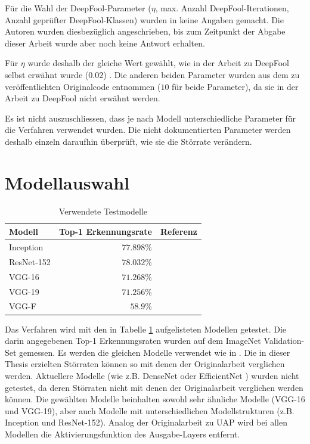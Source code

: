 \documentclass{FFHS_Thesis_Additions/ffhsthesis}
\begin{document}
Für die Wahl der DeepFool-Parameter ($\eta$, max. Anzahl DeepFool-Iterationen, Anzahl geprüfter DeepFool-Klassen) wurden in \cite{moosavi-dezfooli_universal_2017-1} keine Angaben gemacht. Die Autoren wurden diesbezüglich angeschrieben, bis zum Zeitpunkt der Abgabe dieser Arbeit wurde aber noch keine Antwort erhalten.

Für $\eta$ wurde deshalb der gleiche Wert gewählt, wie in der Arbeit zu DeepFool selbst erwähnt wurde ($0.02$) \cite{moosavi-dezfooli_deepfool_2016}. 
Die anderen beiden Parameter wurden aus dem zu \cite{moosavi-dezfooli_universal_2017-1} veröffentlichten Originalcode entnommen ($10$ für beide Parameter), da sie in der Arbeit zu DeepFool nicht erwähnt werden. 

Es ist nicht auszuschliessen, dass je nach Modell unterschiedliche Parameter für die Verfahren verwendet wurden. Die nicht dokumentierten Parameter werden deshalb einzeln daraufhin überprüft, wie sie die Störrate verändern. 

\section{Modellauswahl}
\label{c_modelle}


\begin{table}[]
\centering
\caption{Verwendete Testmodelle}
\begin{tabular}{|l|r|l|}
\hline
Modell				& Top-1 Erkennungsrate	& Referenz						\\ \hline
Inception			& $77.898\%$				&	\cite{szegedy_going_2015}	\\
ResNet-152			& $78.032\%$  			&	\cite{he_deep_2016}			\\
VGG-16				& $71.268\%$  			&	\cite{simonyan_very_2014}	\\
VGG-19				& $71.256\%$     		&	\cite{simonyan_very_2014}	\\
VGG-F				& $58.9\%$    			&	\cite{chatfield_return_2014}\\
\hline 
\end{tabular}
\label{tbl_verwendete_modelle}
\end{table}


Das Verfahren wird mit den in Tabelle \ref{tbl_verwendete_modelle} aufgelisteten Modellen getestet. Die darin angegebenen Top-1 Erkennungsraten wurden auf dem ImageNet Validation-Set gemessen.
Es werden die gleichen Modelle verwendet wie in \cite{moosavi-dezfooli_universal_2017-1}. 
Die in dieser Thesis erzielten Störraten können so mit denen der Originalarbeit verglichen werden. Aktuellere Modelle (wie z.B. DenseNet \cite{huang_densely_2017} oder EfficientNet \cite{tan_efficientnet_2019}) wurden nicht getestet, da deren Störraten nicht mit denen der Originalarbeit verglichen werden können.
Die gewählten Modelle beinhalten sowohl sehr ähnliche Modelle (VGG-16 und VGG-19), aber auch Modelle mit unterschiedlichen Modellstrukturen (z.B. Inception und ResNet-152).
Analog der Originalarbeit zu UAP \cite{moosavi-dezfooli_universal_2017-1} wird bei allen Modellen die Aktivierungsfunktion des Ausgabe-Layers entfernt. 
\end{document}
